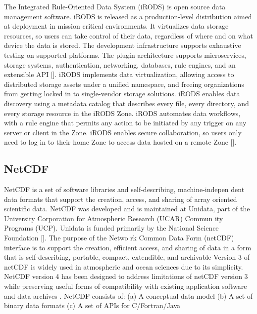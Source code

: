 The Integrated Rule-Oriented Data System (iRODS) is open source data
management software. iRODS is released as a production-level
distribution aimed at deployment in mission critical environments. It
virtualizes data storage resources, so users can take control of their
data, regardless of where and on what device the data is stored. The
development infrastructure supports exhaustive testing on supported
platforms. The plugin architecture supports microservices, storage
systems, authentication, networking, databases, rule engines, and an
extensible API [\cite{irods-www}].  iRODS implements data
virtualization, allowing access to distributed storage assets under a
unified namespace, and freeing organizations from getting locked in to
single-vendor storage solutions. iRODS enables data discovery using a
metadata catalog that describes every file, every directory, and every
storage resource in the iRODS Zone. iRODS automates data workflows,
with a rule engine that permits any action to be initiated by any
trigger on any server or client in the Zone. iRODS enables secure
collaboration, so users only need to log in to their home Zone to
access data hosted on a remote Zone [\cite{github-irods-www}].




\subsection{NetCDF}

NetCDF is a set of software libraries and self-describing,
machine-indepen dent data formats that support the creation, access,
and sharing of array oriented scientific data. NetCDF was developed
and is maintained at Unidata, part of the University Corporation for
Atmospheric Research (UCAR) Commun ity Programs (UCP). Unidata is
funded primarily by the National Science Foundation
\cite{paper-netCDF} [\cite{www-netcdf}]. The purpose of the Netwo rk
Common Data Form (netCDF) interface is to support the creation,
efficient access, and sharing of data in a form that is
self-describing, portable, compact, extendible, and archivable Version
3 of netCDF is widely used in atmospheric and ocean sciences due to
its simplicity. NetCDF version 4 has been designed to address
limitations of netCDF version 3 while preserving useful forms of
compatibility with existing application software and data archives
\cite{paper-netCDF}.  NetCDF consists of: (a) A conceptual data model
(b) A set of binary data formats (c) A set of APIs for C/Fortran/Java

